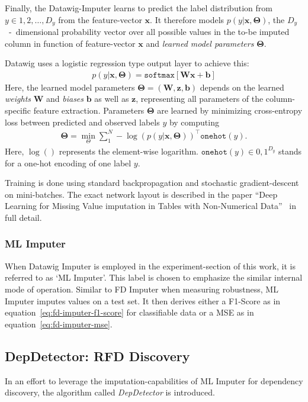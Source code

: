 Finally, the Datawig-Imputer learns to predict the label distribution from \( y \in {1, 2, \dots, D_y} \) from the feature-vector \( \mathbold{x} \).
It therefore models \( p(y|\mathbold{x},\mathbold{\Theta}) \), the \( D_y \)~-~dimensional probability vector over all possible values in the to-be imputed column in function of feature-vector \( \mathbold{x} \) and \emph{learned model parameters} \( \mathbold{\Theta} \).~\cite[p.~2021]{BIE18}

Datawig uses a logistic regression type output layer to achieve this:
\begin{align}
    p(y|\mathbold{x},\mathbold{\Theta}) = \texttt{softmax}[\mathbold{Wx} + \mathbold{b}]
\end{align}
Here, the learned model parameters \( \mathbold{\Theta} = (\mathbold{W}, \mathbold{z}, \mathbold{b}) \) depends on the learned \emph{weights} \( \mathbold{W} \) and \emph{biases} \( \mathbold{b} \) as well as \( \mathbold{z} \), representing all parameters of the column-specific feature extraction.
Parameters \( \mathbold{\Theta} \) are learned by minimizing cross-entropy loss between predicted and observed labels \( y \) by computing
\begin{align}
    \mathbold{\Theta} = \min_{\Theta} \sum\nolimits_{1}^{N} - \log(p(y|\mathbold{x}, \mathbold{\Theta}))^\top \texttt{onehot}(y).
\end{align}
Here, \( \log() \) represents the element-wise logarithm.
\( \texttt{onehot}(y) \in {0, 1}^{D_y}\) stands for a one-hot encoding of one label \( y \).

Training is done using standard backpropagation and stochastic gradient-descent on mini-batches.
The exact network layout is described in the paper ``Deep Learning for Missing Value imputation in Tables with Non-Numerical Data''~\cite[p.~2022]{BIE18} in full detail.

\subsubsection{ML Imputer}
When Datawig Imputer is employed in the experiment-section of this work, it is referred to as `ML Imputer'.
This label is chosen to emphasize the similar internal mode of operation.
Similar to FD Imputer when measuring robustness, ML Imputer imputes values on a test set.
It then derives either a F1-Score as in equation~\ref{eq:fd-imputer-f1-score} for classifiable data or a MSE as in equation~\ref{eq:fd-imputer-mse}.

\subsection{DepDetector: RFD Discovery}
In an effort to leverage the imputation-capabilities of ML Imputer for dependency discovery, the algorithm called \emph{DepDetector} is introduced.

